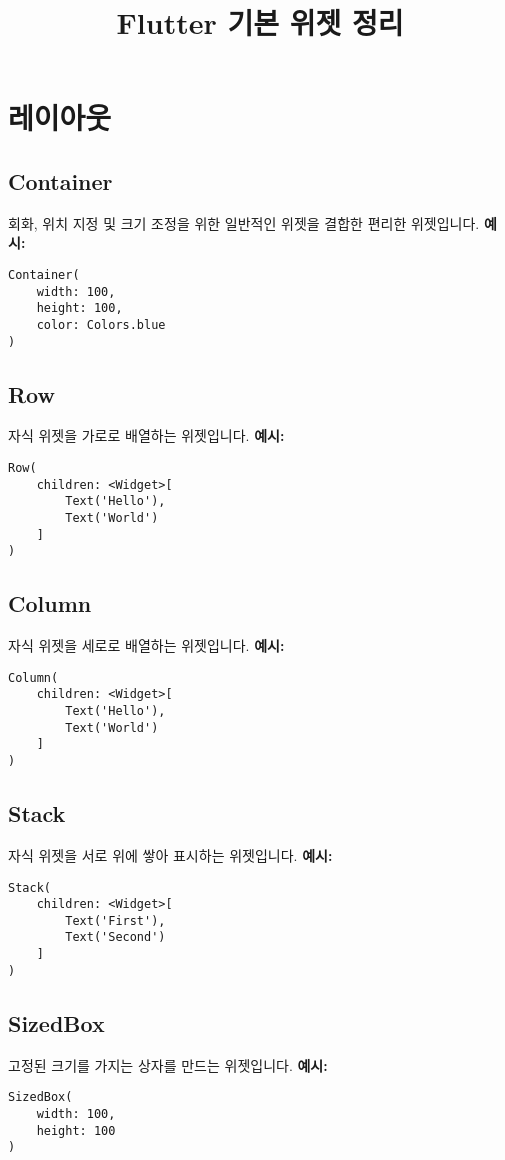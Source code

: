 \documentclass{article}
\title{Flutter 기본 위젯 정리}
\author{}
\date{}
\begin{document}
\maketitle

\section*{레이아웃}
\subsection*{Container}
회화, 위치 지정 및 크기 조정을 위한 일반적인 위젯을 결합한 편리한 위젯입니다.
\textbf{예시:}
\begin{lstlisting}
Container(
    width: 100,
    height: 100,
    color: Colors.blue
)
\end{lstlisting}

\subsection*{Row}
자식 위젯을 가로로 배열하는 위젯입니다.
\textbf{예시:}
\begin{lstlisting}
Row(
    children: <Widget>[
        Text('Hello'),
        Text('World')
    ]
)
\end{lstlisting}

\subsection*{Column}
자식 위젯을 세로로 배열하는 위젯입니다.
\textbf{예시:}
\begin{lstlisting}
Column(
    children: <Widget>[
        Text('Hello'),
        Text('World')
    ]
)
\end{lstlisting}

\subsection*{Stack}
자식 위젯을 서로 위에 쌓아 표시하는 위젯입니다.
\textbf{예시:}
\begin{lstlisting}
Stack(
    children: <Widget>[
        Text('First'),
        Text('Second')
    ]
)
\end{lstlisting}

\subsection*{SizedBox}
고정된 크기를 가지는 상자를 만드는 위젯입니다.
\textbf{예시:}
\begin{lstlisting}
SizedBox(
    width: 100,
    height: 100
)
\end{lstlisting}
\end{document}
